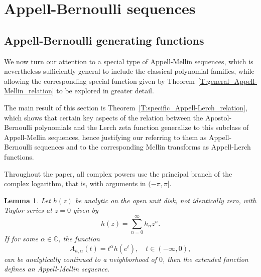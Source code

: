 \documentclass[11pt,a4paper]{amsart}
\newcommand{\C}{\mathbb{C}}
\theoremstyle{plain}
\theoremstyle{plain}
\newtheorem{lemma}{Lemma}
\theoremstyle{definition}
\theoremstyle{remark}
\begin{document}
\section{Appell-Bernoulli sequences}
\label{sec:Appell_Bernoulli}



\subsection{Appell-Bernoulli generating functions}
\label{subsec:Appell-Bernoulli_GF}



We now turn our attention to a special type of Appell-Mellin sequences, which is nevertheless sufficiently general to include the classical polynomial families, while allowing the corresponding special function given by Theorem~\ref{T:general_Appell-Mellin_relation} to be explored in greater detail.

The main result of this section is Theorem~\ref{T:specific_Appell-Lerch_relation}, which shows that certain key aspects of the relation between the Apostol-Bernoulli polynomials and the Lerch zeta function generalize to this subclass of Appell-Mellin sequences, hence justifying our referring to them as Appell-Bernoulli sequences and to the corresponding Mellin transforms as Appell-Lerch functions.

Throughout the paper, all complex powers use the principal branch of the complex logarithm, that is, with arguments in $(-\pi,\pi]$.


\begin{lemma}
\label{L:Appell-Bernoulli_h}
Let $h(z)$ be analytic on the open unit disk, not identically zero, with Taylor series at $z = 0$ given by
\[
	h(z)=\sum_{n=0}^\infty h_{n} z^n.
\]
If for some $\alpha \in \C$, the function
\begin{equation*}
	A_{h,\alpha}(t) = t^\alpha h(e^{t}), \quad t \in (-\infty,0),
\end{equation*}
can be analytically continued to a neighborhood of $0$, then the extended function defines an Appell-Mellin sequence.
\end{lemma}
\end{document}
